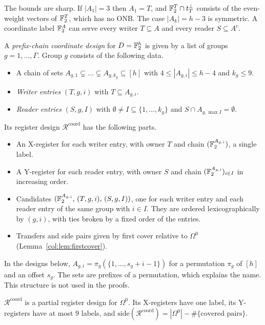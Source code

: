The bounds are sharp. If $|A_1|=3$ then $A_1=T$, and $\mathbb{F}_2^T\cap t_T^\perp$ consists of the even-weight
vectors of $\mathbb{F}_2^T$, which has no ONB. The case $|A_k|=h-3$ is symmetric. A coordinate label $\mathbb{F}_2^A$ can
serve every writer $T\subseteq A$ and every reader $S\subseteq A^c$.

\begin{definition}\label{col:def:prefix}
A \emph{prefix-chain coordinate design} for $D=\mathbb{F}_2^h$ is given by a list of groups $g=1,\dots,\Gamma$.
Group $g$ consists of the following data.
\begin{itemize}
\item A chain of sets $A_{g,1}\subsetneq\dots\subsetneq A_{g,k_g}\subseteq[h]$ with $4\le|A_{g,i}|\le h-4$ and
  $k_g\le9$.
\item \emph{Writer entries} $(T,g,i)$ with $T\subseteq A_{g,i}$.
\item \emph{Reader entries} $(S,g,I)$ with $\emptyset\ne I\subseteq\{1,\dots,k_g\}$ and
  $S\cap A_{g,\max I}=\emptyset$.
\end{itemize}
Its register design $\mathcal R^{\mathrm{coord}}$ has the following parts.
\begin{itemize}
\item An X-register for each writer entry, with owner $T$ and chain $(\mathbb{F}_2^{A_{g,i}})$, a single label.
\item A Y-register for each reader entry, with owner $S$ and chain $(\mathbb{F}_2^{A_{g,i}})_{i\in I}$ in increasing
  order.
\item Candidates $(\mathbb{F}_2^{A_{g,i}},\,(T,g,i),\,(S,g,I))$, one for each writer entry and each reader entry of
  the same group with $i\in I$. They are ordered lexicographically by $(g,i)$, with ties broken by a fixed
  order of the entries.
\item Transfers and side pairs given by first cover relative to $\Omega^0$
  (Lemma~\ref{col:lem:firstcover}).
\end{itemize}
In the designs below, $A_{g,i}=\pi_g(\{1,\dots,s_g+i-1\})$ for a permutation $\pi_g$ of $[h]$ and an offset
$s_g$. The sets are prefixes of a permutation, which explains the name. This structure is not used in
the proofs.
\end{definition}

\begin{lemma}\label{col:lem:prefix}
$\mathcal R^{\mathrm{coord}}$ is a partial register design for $\Omega^0$. Its X-registers have one label, its
Y-registers have at most $9$ labels, and
$\mathrm{side}(\mathcal R^{\mathrm{coord}})=|\Omega^0|-\#\{\text{covered pairs}\}$.
\end{lemma}


